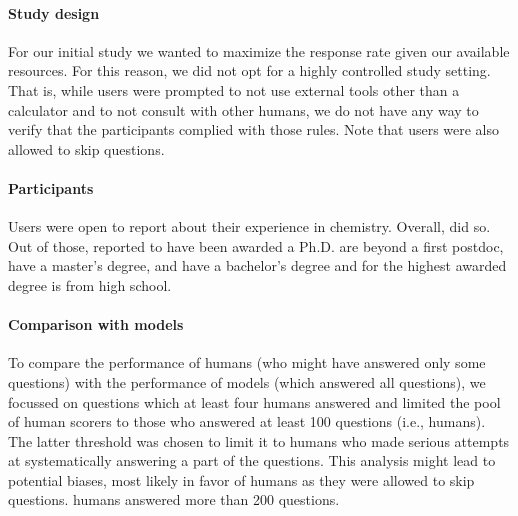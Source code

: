 \documentclass[11pt, oneside]{article}
\begin{document}
\paragraph{Study design}
For our initial study we wanted to maximize the response rate given our available resources. 
For this reason, we did not opt for a highly controlled study setting. 
That is, while users were prompted to not use external tools other than a calculator and to not consult with other humans, we do not have any way to verify that the participants complied with those rules. 
Note that users were also allowed to skip questions.


\paragraph{Participants}
Users were open to report about their experience in chemistry. 
Overall,  did so. 
Out of those,  reported to have been awarded a Ph.D.
 are beyond a first postdoc,  have a master's degree, and  have a bachelor's degree and for  the highest awarded degree is from high school.


\paragraph{Comparison with models}
To compare the performance of humans (who might have answered only some questions) with the performance of models (which answered all questions), we focussed on questions which at least four humans answered and limited the pool of human scorers to those who answered at least 100 questions (i.e.,  humans). 
The latter threshold was chosen to limit it to humans who made serious attempts at systematically answering a part of the questions. 
This analysis might lead to potential biases, most likely in favor of humans as they were allowed to skip questions.  humans answered more than 200 questions.
\end{document}

